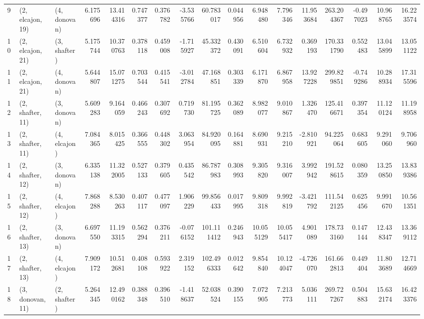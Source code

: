 \begin{tabular}{lllrrrrrrrrrrrrrr}
9  &  (2, elcajon, 19) &     (4, donovan) &   6.175696 &  13.414316 &   0.747377 &  0.376782 & -3.535766 &    60.783017 &   0.044956 &   6.948480 &   7.796346 &  11.953684 &  263.204367 & -0.497023 &  10.968765 &  16.223574 \\
10 &  (2, elcajon, 21) &     (3, shafter) &   5.175744 &  10.370763 &   0.378118 &  0.459008 & -1.715927 &    45.332372 &   0.430091 &   6.510604 &   6.732932 &   0.369193 &  170.331790 &  0.552483 &  13.045899 &  13.051122 \\
11 &  (2, elcajon, 21) &     (4, donovan) &   5.644807 &  15.071275 &   0.703544 &  0.415541 & -3.012784 &    47.168851 &   0.303339 &   6.171870 &   6.867958 &  13.927228 &  299.829851 & -0.749286 &  10.288934 &  17.315596 \\
12 &  (2, shafter, 11) &     (3, donovan) &   5.609283 &   9.164059 &   0.466243 &  0.307692 &  0.719730 &    81.195725 &   0.362089 &   8.982077 &   9.010867 &   1.326470 &  125.416671 &  0.397354 &  11.120124 &  11.198958 \\
13 &  (2, shafter, 11) &     (4, elcajon) &   7.084365 &   8.015425 &   0.366555 &  0.448302 &  3.063954 &    84.920095 &   0.164881 &   8.690931 &   9.215210 &  -2.810921 &   94.225064 &  0.683605 &   9.291060 &   9.706960 \\
14 &  (2, shafter, 12) &     (3, donovan) &   6.335138 &  11.322005 &   0.527133 &  0.379605 &  0.435542 &    86.787983 &   0.308993 &   9.305820 &   9.316007 &   3.992942 &  191.528615 &  0.080359 &  13.250850 &  13.839386 \\
15 &  (2, shafter, 12) &     (4, elcajon) &   7.868288 &   8.530263 &   0.407117 &  0.477097 &  1.906229 &    99.856433 &   0.017995 &   9.809318 &   9.992819 &  -3.421792 &  111.542125 &  0.625456 &   9.991670 &  10.561351 \\
16 &  (2, shafter, 13) &     (3, donovan) &   6.697550 &  11.193315 &   0.562294 &  0.376211 & -0.076152 &   101.111412 &   0.246943 &  10.055129 &  10.055417 &   4.901089 &  178.733160 &  0.147144 &  12.438347 &  13.369112 \\
17 &  (2, shafter, 13) &     (4, elcajon) &   7.909172 &  10.512681 &   0.408108 &  0.593922 &  2.319152 &   102.496333 &   0.012642 &   9.854840 &  10.124047 &  -4.726070 &  161.662813 &  0.449404 &  11.803689 &  12.714669 \\
18 &  (3, donovan, 11) &     (2, shafter) &   5.264345 &  12.490162 &   0.388348 &  0.396510 & -1.418637 &    52.038524 &   0.390155 &   7.072905 &   7.213773 &   5.036111 &  269.727267 &  0.504883 &  15.632174 &  16.423376 \\

\end{tabular}
